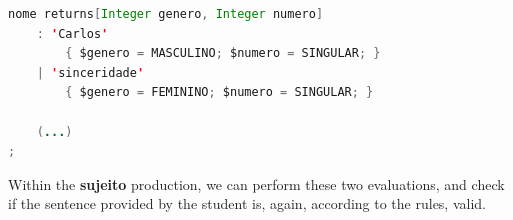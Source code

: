
\begin{center}
\begin{minipage}{13cm}
\begin{lstlisting}[language=java, basicstyle=\small, label={lst:nome_dsl_excerpt}, caption=Excerpt of the ``nome'' production]
nome returns[Integer genero, Integer numero]
    : 'Carlos'
        { $genero = MASCULINO; $numero = SINGULAR; }
    | 'sinceridade'
        { $genero = FEMININO; $numero = SINGULAR; }

    (...)
;
\end{lstlisting}
\end{minipage}
\end{center}

%    


Within the \textbf{sujeito} production, we can perform these two evaluations, and check if the sentence provided by the student is, again, according to the rules, valid.

